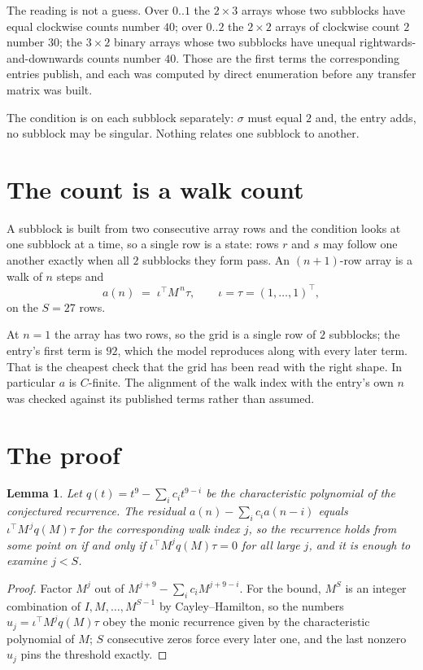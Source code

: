 \documentclass[11pt,a4paper]{article}
\theoremstyle{plain}
\newtheorem{lemma}[theorem]{Lemma}
\theoremstyle{definition}
\begin{document}
The reading is not a guess. Over $0..1$ the $2\times3$ arrays whose two subblocks have equal
clockwise counts number $40$; over $0..2$ the $2\times2$ arrays of clockwise count $2$ number
$30$; the $3\times2$ binary arrays whose two subblocks have unequal rightwards-and-downwards
counts number $40$. Those are the first terms the corresponding entries publish, and each was
computed by direct enumeration before any transfer matrix was built.

The condition is on each subblock separately: $\sigma$ must equal $2$ and, the entry adds, no subblock may be singular. Nothing
relates one subblock to another.

\section{The count is a walk count}

A subblock is built from two consecutive array rows and the condition looks
at one subblock at a time, so a single row is a state: rows $r$ and $s$ may follow one another
exactly when all $2$ subblocks they form pass. An $(n+1)$-row array is a walk of $n$ steps and
\[
a(n)\;=\;\iota^{\!\top}M^{\,n}\tau,\qquad\iota=\tau=(1,\dots,1)^{\!\top},
\]
on the $S=27$ rows.

At $n=1$ the array has two rows, so the grid is a single row of $2$
subblocks; the entry's first term is $92$, which the model
reproduces along with every later term. That is the cheapest check that the grid has been read
with the right shape.
In particular $a$ is $C$-finite. The alignment of the walk index with the entry's own $n$ was
checked against its published terms rather than assumed.

\section{The proof}

\begin{lemma}\label{lem:crit}
Let $q(t)=t^{9}-\sum_i c_it^{9-i}$ be the characteristic polynomial of the
conjectured recurrence. The residual $a(n)-\sum_ic_ia(n-i)$ equals
$\iota^{\!\top}M^{\,j}q(M)\tau$ for the corresponding walk index $j$, so the recurrence
holds from some point on if and only if $\iota^{\!\top}M^{j}q(M)\tau=0$ for all large $j$,
and it is enough to examine $j<S$.
\end{lemma}

\begin{proof}
Factor $M^{j}$ out of $M^{j+9}-\sum_ic_iM^{j+9-i}$. For the bound, $M^{S}$
is an integer combination of $I,M,\dots,M^{S-1}$ by Cayley--Hamilton, so the numbers
$u_j=\iota^{\!\top}M^{j}q(M)\tau$ obey the monic recurrence given by the characteristic
polynomial of $M$; $S$ consecutive zeros force every later one, and the last nonzero $u_j$
pins the threshold exactly.
\end{proof}
\end{document}
